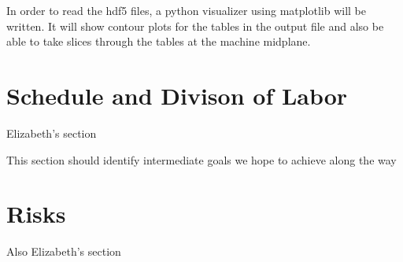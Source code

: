 \documentclass[paper=a4, fontsize=11pt]{scrartcl} %
\numberwithin{equation}{section} %
\numberwithin{figure}{section} %
\numberwithin{table}{section} %
\begin{document}
In order to read the hdf5 files, a python visualizer using matplotlib will be written. It will show contour plots for the tables in the output file and also be able to take slices through the tables at the machine midplane.


\section{Schedule and Divison of Labor}

Elizabeth's section
\newline

This section should identify intermediate goals we hope to achieve along the way


\section{Risks}

Also Elizabeth's section
\end{document}
